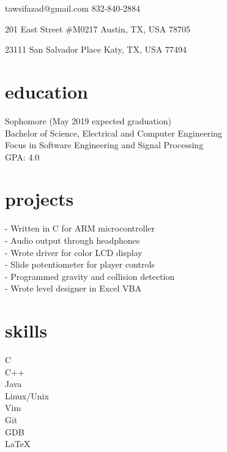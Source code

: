 \documentclass[12pt]{cv}
\begin{document}
\leftskip 8pc
%
\begin{flushright}%

\vspace{0.5pc}
\contact
    {tawsifazad@gmail.com}%
    {832-840-2884}%

\address
    {Present}%
    {201 East  Street \#M0217}%
    {Austin, TX, USA}%
    {78705}%

\address
    {Permanent}%
    {23111 San Salvador Place}%
    {Katy, TX, USA}%
    {77494}%
\end{flushright}%

\vspace{1pc}
\section{education}%
Sophomore (May 2019 expected graduation) \\
Bachelor of Science, Electrical and Computer Engineering \\
Focus in Software Engineering and Signal Processing \\
GPA: 4.0 \\
\section{projects}%
- Written in C for ARM microcontroller \\
- Audio output through headphones \\
- Wrote driver for color LCD display \\
- Slide potentiometer for player controls \\
- Programmed gravity and collision detection \\
- Wrote level designer in Excel VBA \\
\section{skills}%
%
C\\
C++\\
\vspace{1pc}
Java\\
%
Linux/Unix\\
Vim\\
Git\\
GDB\\
\LaTeX\\
\hfill
\end{document}
